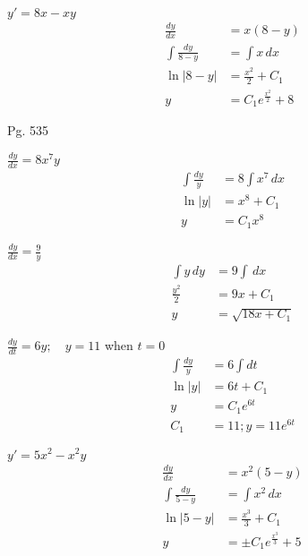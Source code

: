 \documentclass[12pt]{article}
\newenvironment{problem}[2][]{
    \begin{trivlist}
        \item[
            {\bfseries #1}
            {\bfseries #2.}
        ]
}{\end{trivlist}}
\newcommand{\dx}{\, dx}
\newcommand{\dy}{\, dy}
\begin{document}
\begin{problem}{45}
$y' = 8x - xy$
\begin{align}
\frac{dy}{dx} &= x\left(8 - y\right) \\
\int \frac{dy}{8 - y} &= \int x \dx \\
\ln\left|8 - y\right| &= \frac{x^2}{2} + C_1 \\
y &= C_1e^{\frac{x^2}{2}} + 8
\end{align}
\end{problem}

\noindent Pg. 535

\begin{problem}{26}
$\frac{dy}{dx} = 8x^7y$
\begin{align}
\int \frac{dy}{y} &= 8 \int x^7 \dx \\
\ln\left|y\right| &= x^8 + C_1 \\
y &= C_1x^8
\end{align}
\end{problem}

\begin{problem}{27}
$\frac{dy}{dx} = \frac{9}{y}$
\begin{align}
\int y \dy &= 9 \int \dx \\
\frac{y^2}{2} &= 9x + C_1 \\
y &= \sqrt{18x + C_1}
\end{align}
\end{problem}

\begin{problem}{28}
$\frac{dy}{dt} = 6y; \quad y = 11$ when $t = 0$
\begin{align}
\int \frac{dy}{y} &= 6 \int dt \\
\ln\left|y\right| &= 6t + C_1 \\
y &= C_1e^{6t} \\
C_1 &= 11; y = 11e^{6t}
\end{align}
\end{problem}

\begin{problem}{29}
$y' = 5x^2 - x^2y$
\begin{align}
\frac{dy}{dx} &= x^2 \left(5 - y\right) \\
\int \frac{dy}{5 - y} &= \int x^2 \dx \\
\ln\left|5 - y\right| &= \frac{x^3}{3} + C_1 \\
y &= \pm C_1e^{\frac{x^3}{3}} + 5
\end{align}
\end{problem}
\end{document}
